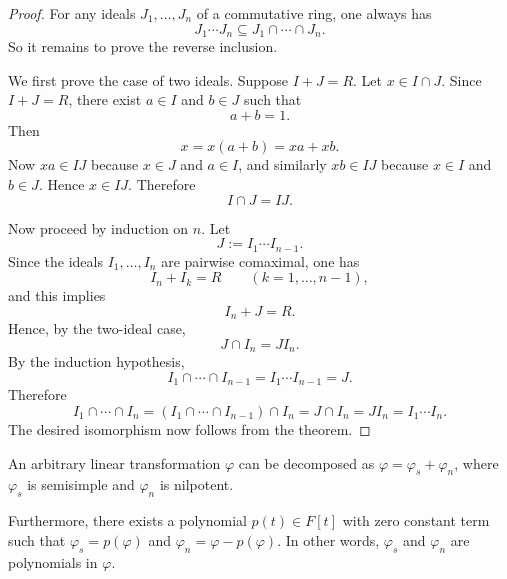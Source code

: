 \begin{proof}
    For any ideals $J_1,\dots,J_n$ of a commutative ring, one always has
    \[
        J_1\cdots J_n \subseteq J_1\cap\cdots\cap J_n.
    \]
    So it remains to prove the reverse inclusion.

    We first prove the case of two ideals. Suppose $I+J=R$. Let $x\in I\cap J$. Since
    $I+J=R$, there exist $a\in I$ and $b\in J$ such that
    \[
        a+b=1.
    \]
    Then
    \[
        x=x(a+b)=xa+xb.
    \]
    Now $xa\in IJ$ because $x\in J$ and $a\in I$, and similarly $xb\in IJ$ because
    $x\in I$ and $b\in J$. Hence $x\in IJ$. Therefore
    \[
        I\cap J=IJ.
    \]

    Now proceed by induction on $n$. Let
    \[
        J:=I_1\cdots I_{n-1}.
    \]
    Since the ideals $I_1,\dots,I_n$ are pairwise comaximal, one has
    \[
        I_n+I_k=R \qquad (k=1,\dots,n-1),
    \]
    and this implies
    \[
        I_n+J=R.
    \]
    Hence, by the two-ideal case,
    \[
        J\cap I_n = JI_n.
    \]
    By the induction hypothesis,
    \[
        I_1\cap\cdots\cap I_{n-1}=I_1\cdots I_{n-1}=J.
    \]
    Therefore
    \[
        I_1\cap\cdots\cap I_n
        =
        (I_1\cap\cdots\cap I_{n-1})\cap I_n
        =
        J\cap I_n
        =
        JI_n
        =
        I_1\cdots I_n.
    \]
    The desired isomorphism now follows from the theorem.
\end{proof}

\begin{theorem}
    An arbitrary linear transformation $\varphi$ can be decomposed as $\varphi = \varphi_s + \varphi_n$, where $\varphi_s$ is semisimple and $\varphi_n$ is nilpotent.

    Furthermore, there exists a polynomial $p(t) \in F[t]$ with zero constant term such that $\varphi_s=p(\varphi)$ and $\varphi_n=\varphi-p(\varphi)$. In other words, $\varphi_s$ and $\varphi_n$ are polynomials in $\varphi$.
\end{theorem}

